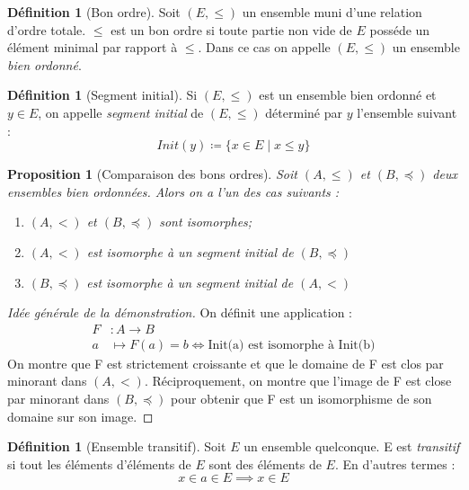 \documentclass{article}
\theoremstyle{definition}
\newtheorem{definition}[subsubsection]{Définition}
\theoremstyle{plain}
\newtheorem{proposition}[subsubsection]{Proposition}
\theoremstyle{plain}
\theoremstyle{plain}
\theoremstyle{plain}
\theoremstyle{plain}
\begin{document}
\begin{definition}[Bon ordre]
	Soit \( (E,\le) \) un ensemble muni d'une relation d'ordre totale. \( \le \) est un bon ordre si toute partie non vide de \( E \) posséde un élément minimal par rapport à \( \le \). Dans ce cas on appelle \( (E,\le) \) un ensemble \textit{bien ordonné}.	
\end{definition}

\begin{definition}[Segment initial]
	Si \( (E,\le) \) est un ensemble bien ordonné et \( y \in E\), on appelle \textit{segment initial} de \( (E,\le) \) déterminé par \( y \) l'ensemble suivant :
	\begin{equation*}
		Init(y) \coloneqq \{ x \in E \mid x \le y \}
	\end{equation*}
\end{definition}

\begin{proposition}[Comparaison des bons ordres]
	Soit \( (A,\le) \) et \( (B,\preceq) \) deux ensembles bien ordonnées. Alors on a l'un des cas suivants :
	\begin{enumerate}[label = (\roman*)]
		\item \( (A,<) \) et \( (B,\preceq) \) sont isomorphes;
		\item \( (A,<) \) est isomorphe à un segment initial de \( (B,\preceq) \)
		\item \( (B,\preceq) \) est isomorphe à un segment initial de \( (A,<) \)
	\end{enumerate}
\end{proposition}
\begin{proof}[Idée générale de la démonstration]
	On définit une application :
	\begin{align*}
		F &: A \rightarrow B \\
		a &\mapsto F(a) = b \Leftrightarrow \text{Init(a) est isomorphe à Init(b)}
	\end{align*}
	On montre que F est strictement croissante et que le domaine de F est clos par minorant dans \( (A,<) \). Réciproquement, on montre que l'image de F est close par minorant dans \( (B,\preceq) \) pour obtenir que F est un isomorphisme de son domaine sur son image.
\end{proof}
\begin{definition}[Ensemble transitif]
	Soit \( E \) un ensemble quelconque. E est \textit{transitif} si tout les éléments d'éléments de \( E \) sont des éléments de \( E \). En d'autres termes :
	\begin{equation}\label{eq:Tr} \tag{Tr}
		x \in a \in E \implies x \in E 
	\end{equation}
\end{definition}
\end{document}
